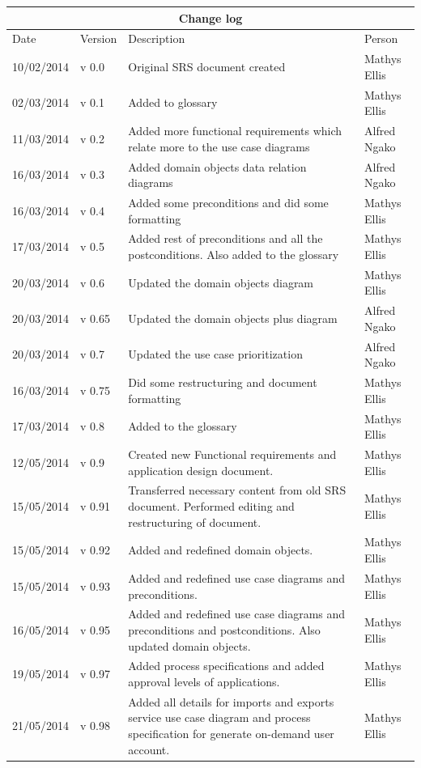 \documentclass[12pt]{article}
\begin{document}
\begin{center}
\begin{tabular}{|l|p{1.4cm}|p{8cm}|p{2.8cm}|}
\hline
\multicolumn{4}{|c|}{\bf Change log} \\
\hline
 Date & Version & Description &  Person \\
\hline
10/02/2014 & v 0.0 & Original SRS document created & Mathys Ellis \\
\hline
02/03/2014 & v 0.1 & Added to glossary & Mathys Ellis \\
\hline
11/03/2014 & v 0.2 & Added more functional requirements which relate more to the use case diagrams & Alfred Ngako \\
\hline
16/03/2014 & v 0.3 & Added domain objects data relation diagrams & Alfred Ngako \\
\hline
16/03/2014 & v 0.4 & Added some preconditions and did some formatting & Mathys Ellis \\
\hline
17/03/2014 & v 0.5 & Added rest of preconditions and all the postconditions. Also added to the glossary & Mathys Ellis \\
\hline
20/03/2014 & v 0.6 & Updated the domain objects diagram  & Mathys Ellis \\
\hline
20/03/2014 & v 0.65 & Updated the domain objects plus diagram  & Alfred Ngako \\
\hline
20/03/2014 & v 0.7 & Updated the use case prioritization  & Alfred Ngako \\
\hline
16/03/2014 & v 0.75 & Did some restructuring and document formatting & Mathys Ellis \\
\hline
17/03/2014 & v 0.8 & Added to the glossary & Mathys Ellis \\
\hline
12/05/2014 & v 0.9 & Created new Functional requirements and application design document. & Mathys Ellis \\
\hline
15/05/2014 & v 0.91 & Transferred necessary content from old SRS document. Performed editing and restructuring of document. & Mathys Ellis \\
\hline
15/05/2014 & v 0.92 & Added and redefined domain objects. & Mathys Ellis \\
\hline
15/05/2014 & v 0.93 & Added and redefined use case diagrams and preconditions. & Mathys Ellis \\
\hline
16/05/2014 & v 0.95 & Added and redefined use case diagrams and preconditions and postconditions. Also updated domain objects. & Mathys Ellis \\
\hline
19/05/2014 & v 0.97 & Added process specifications and added approval levels of applications. & Mathys Ellis \\
\hline
21/05/2014 & v 0.98 & Added all details for imports and exports service use case diagram and process specification for generate on-demand user account. & Mathys Ellis \\
\hline


\end{tabular}
\end{center}
\newpage
\tableofcontents
\end{document}

